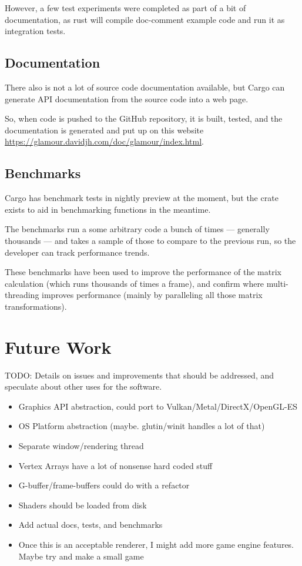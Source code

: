 \begin{multicols}{2}
  However, a few test experiments were completed as part of a bit of documentation, as rust will compile doc-comment example code and run it as integration tests.

  \subsection{Documentation}
  There also is not a lot of source code documentation available, but Cargo can generate API documentation from the source code into a web page.

  So, when code is pushed to the GitHub repository, it is built, tested, and the documentation is generated and put up on this website \url{https://glamour.davidjh.com/doc/glamour/index.html}.

  \subsection{Benchmarks}
  Cargo has benchmark tests in nightly preview at the moment, but the  crate exists to aid in benchmarking functions in the meantime.

  The benchmarks run a some arbitrary code a bunch of times — generally thousands — and takes a sample of those to compare to the previous run, so the developer can track performance trends.

  These benchmarks have been used to improve the performance of the  matrix calculation (which runs thousands of times a frame), and confirm where multi-threading improves performance (mainly by paralleling all those matrix transformations).

  \section{Future Work}

  TODO: Details on issues and improvements that should be addressed, and speculate about other uses for the software.

  \begin{itemize}
    \item Graphics API abstraction, could port to Vulkan/Metal/DirectX/OpenGL-ES
    \item OS Platform abstraction (maybe. glutin/winit handles a lot of that)
    \item Separate window/rendering thread
    \item Vertex Arrays have a lot of nonsense hard coded stuff
    \item G-buffer/frame-buffers could do with a refactor
    \item Shaders should be loaded from disk
    \item Add actual docs, tests, and benchmarks
    \item Once this is an acceptable renderer, I might add more game engine features. Maybe try and make a small game
  \end{itemize}

\end{multicols}

